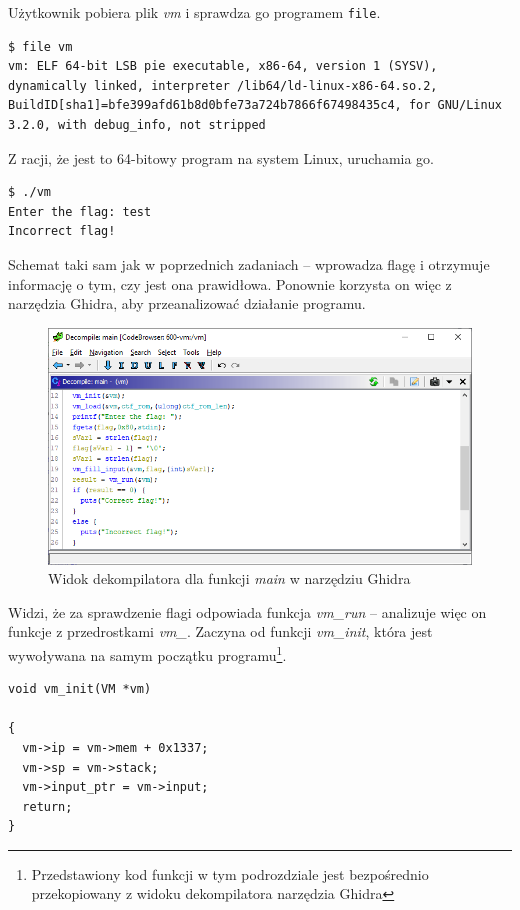 \documentclass[language=polish,type=eng]{aghmodern}
\begin{document}
\begin{appendices}
Użytkownik pobiera plik \emph{vm} i sprawdza go programem \texttt{file}.

\begin{verbatim}
$ file vm
vm: ELF 64-bit LSB pie executable, x86-64, version 1 (SYSV), dynamically linked, interpreter /lib64/ld-linux-x86-64.so.2, BuildID[sha1]=bfe399afd61b8d0bfe73a724b7866f67498435c4, for GNU/Linux 3.2.0, with debug_info, not stripped
\end{verbatim}

Z racji, że jest to 64-bitowy program na system Linux, uruchamia go.

\begin{verbatim}
$ ./vm
Enter the flag: test
Incorrect flag!
\end{verbatim}

Schemat taki sam jak w poprzednich zadaniach -- wprowadza flagę i otrzymuje informację
o tym, czy jest ona prawidłowa. Ponownie korzysta on więc z narzędzia Ghidra, aby
przeanalizować działanie programu.

\begin{figure}[H]
\centering
\includegraphics[width=\textwidth]{600_main}
\caption{Widok dekompilatora dla funkcji \emph{main} w narzędziu Ghidra}
\end{figure}

Widzi, że za sprawdzenie flagi odpowiada funkcja \emph{vm\_run} -- analizuje więc on
funkcje z przedrostkami \emph{vm\_}. Zaczyna od funkcji \emph{vm\_init}, która jest
wywoływana na samym początku programu\footnote{Przedstawiony kod funkcji w tym podrozdziale
jest bezpośrednio przekopiowany z widoku dekompilatora narzędzia Ghidra}.

\begin{verbatim}
void vm_init(VM *vm)

{
  vm->ip = vm->mem + 0x1337;
  vm->sp = vm->stack;
  vm->input_ptr = vm->input;
  return;
}
\end{verbatim}


\end{appendices}
\end{document}
